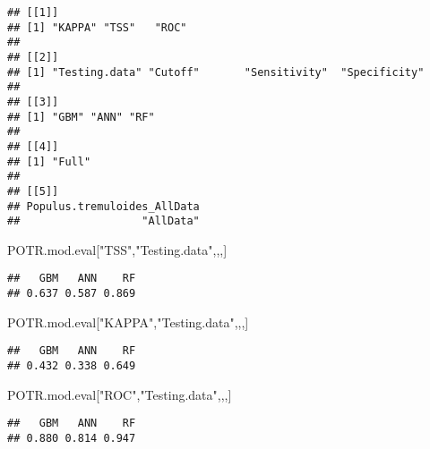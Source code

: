 \documentclass[]{article}
\newenvironment{Shaded}{\begin{snugshade}}{\end{snugshade}}
\newcommand{\StringTok}[1]{\textcolor[rgb]{0.31,0.60,0.02}{#1}}
\newcommand{\NormalTok}[1]{#1}
\begin{document}
\begin{verbatim}
## [[1]]
## [1] "KAPPA" "TSS"   "ROC"  
## 
## [[2]]
## [1] "Testing.data" "Cutoff"       "Sensitivity"  "Specificity" 
## 
## [[3]]
## [1] "GBM" "ANN" "RF" 
## 
## [[4]]
## [1] "Full"
## 
## [[5]]
## Populus.tremuloides_AllData 
##                   "AllData"
\end{verbatim}

\begin{Shaded}
\begin{Highlighting}[]
\NormalTok{    POTR.mod.eval[}\StringTok{"TSS"}\NormalTok{,}\StringTok{"Testing.data"}\NormalTok{,,,]}
\end{Highlighting}
\end{Shaded}

\begin{verbatim}
##   GBM   ANN    RF 
## 0.637 0.587 0.869
\end{verbatim}

\begin{Shaded}
\begin{Highlighting}[]
\NormalTok{    POTR.mod.eval[}\StringTok{"KAPPA"}\NormalTok{,}\StringTok{"Testing.data"}\NormalTok{,,,]}
\end{Highlighting}
\end{Shaded}

\begin{verbatim}
##   GBM   ANN    RF 
## 0.432 0.338 0.649
\end{verbatim}

\begin{Shaded}
\begin{Highlighting}[]
\NormalTok{    POTR.mod.eval[}\StringTok{"ROC"}\NormalTok{,}\StringTok{"Testing.data"}\NormalTok{,,,]}
\end{Highlighting}
\end{Shaded}

\begin{verbatim}
##   GBM   ANN    RF 
## 0.880 0.814 0.947
\end{verbatim}
\end{document}
